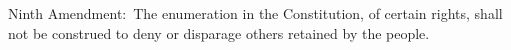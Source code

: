 \documentclass[preview,border=0.80001bp, convert=imagemagick]{standalone}
\begin{document}
\parbox[t][36pt][c]{300pt}{
	\fmmfamily
	Ninth Amendment:\ The enumeration in the Constitution, of certain
	rights, shall not be construed to deny or disparage others retained
	by the people.
}
\end{document}
